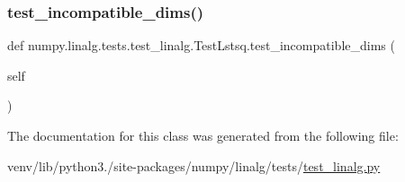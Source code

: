 \mbox{\label{classnumpy_1_1linalg_1_1tests_1_1test__linalg_1_1TestLstsq_a5e6bae341747402976570440a5fb2d1c}} 
\subsubsection{\texorpdfstring{test\+\_\+incompatible\+\_\+dims()}{test\_incompatible\_dims()}}
{\footnotesize\ttfamily def numpy.\+linalg.\+tests.\+test\+\_\+linalg.\+Test\+Lstsq.\+test\+\_\+incompatible\+\_\+dims (\begin{DoxyParamCaption}\item[{}]{self }\end{DoxyParamCaption})}



The documentation for this class was generated from the following file\+:\begin{DoxyCompactItemize}
\item 
venv/lib/python3./site-\/packages/numpy/linalg/tests/\hyperlink{test__linalg_8py}{test\+\_\+linalg.\+py}\end{DoxyCompactItemize}
